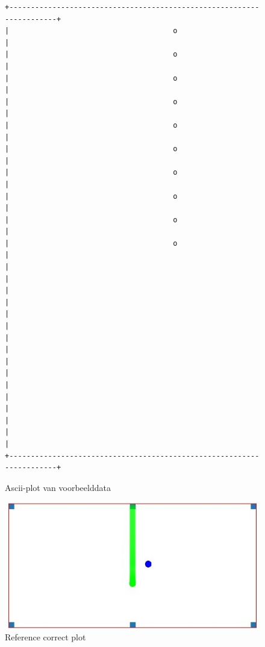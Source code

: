 \documentclass{article}
\begin{document}
\begin{figure}
\begin{verbatim}
+----------------------------------------------------------------------+ 
|                                      o                               | 
|                                      o                               | 
|                                      o                               | 
|                                      o                               | 
|                                      o                               | 
|                                      o                               | 
|                                      o                               | 
|                                      o                               | 
|                                      o                               | 
|                                      o                               | 
|                                                                      | 
|                                                                      | 
|                                                                      | 
|                                                                      | 
|                                                                      | 
|                                                                      | 
|                                                                      | 
|                                                                      | 
+----------------------------------------------------------------------+ 
\end{verbatim}
\caption{Ascii-plot van voorbeelddata}
\label{fig:ascii-box}
\end{figure}
\begin{figure}
  \includegraphics[width=\linewidth]{sampleplot.jpg}
  \caption{Reference correct plot}
  \label{fig:exampleplot}
\end{figure}
\newpage
\end{document}
